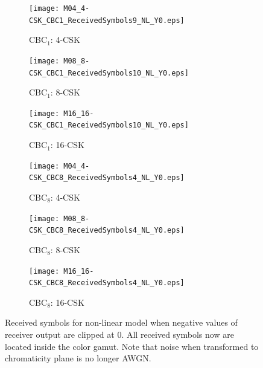 \documentclass[10pt,letterpaper]{article}
\begin{document}
\begin{figure}[t]
	\centering
		\begin{subfigure}{0.32\textwidth}
		\centering
			\texttt{[image: M04\_4-CSK\_CBC1\_ReceivedSymbols9\_NL\_Y0.eps]}
			\caption{CBC$_{1}$: 4-CSK}
			\label{fig4RcvSym_NL1_Y0}
		\end{subfigure}
		\hfill
		\begin{subfigure}{0.32\textwidth}
		\centering
			\texttt{[image: M08\_8-CSK\_CBC1\_ReceivedSymbols10\_NL\_Y0.eps]}
			\caption{CBC$_{1}$: 8-CSK}
			\label{fig8RcvSym_NL1_Y0}
		\end{subfigure}
		\hfill
		\begin{subfigure}{0.32\textwidth}
		\centering
			\texttt{[image: M16\_16-CSK\_CBC1\_ReceivedSymbols10\_NL\_Y0.eps]}
			\caption{CBC$_{1}$: 16-CSK}
			\label{fig16RcvSym_NL1_Y0}
		\end{subfigure}
		\vfill
		\begin{subfigure}{0.32\textwidth}
		\centering
			\texttt{[image: M04\_4-CSK\_CBC8\_ReceivedSymbols4\_NL\_Y0.eps]}
			\caption{CBC$_{8}$: 4-CSK}
			\label{fig4RcvSym_NL8_Y0}
		\end{subfigure}
		\hfill
		\begin{subfigure}{0.32\textwidth}
		\centering
			\texttt{[image: M08\_8-CSK\_CBC8\_ReceivedSymbols4\_NL\_Y0.eps]}
			\caption{CBC$_{8}$: 8-CSK}
			\label{fig8RcvSym_NL8_Y0}
		\end{subfigure}
		\hfill
		\begin{subfigure}{0.32\textwidth}
		\centering
			\texttt{[image: M16\_16-CSK\_CBC8\_ReceivedSymbols4\_NL\_Y0.eps]}
			\caption{CBC$_{8}$: 16-CSK}
			\label{fig16RcvSym_NL8_Y0}
		\end{subfigure}
	\caption{\color{red}Received symbols for non-linear model when negative values of receiver output are clipped at 0. All received symbols now are located inside the color gamut. Note that noise when transformed to chromaticity plane is no longer AWGN.}
	\label{figRcvSym_NL_Y0}
\end{figure}
\end{document}
